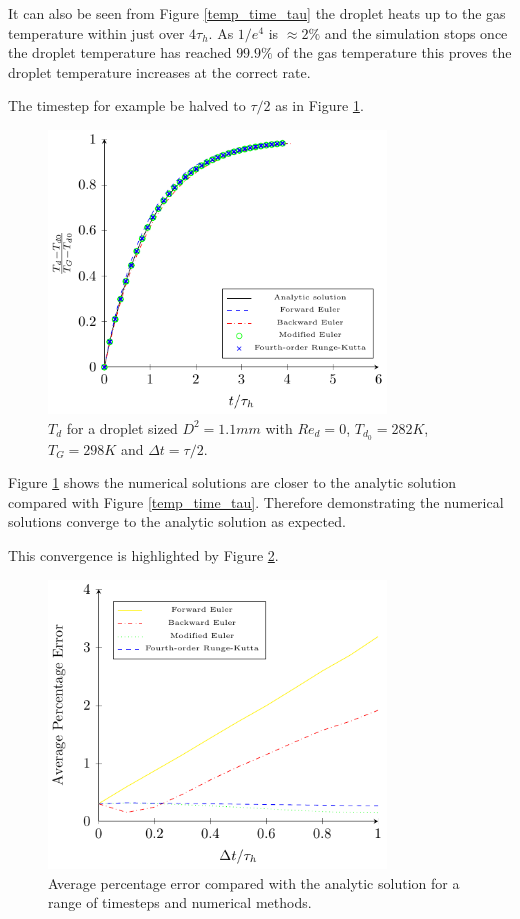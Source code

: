 \documentclass[../Interim_Report_Master]{subfiles}
\begin{document}
It can also be seen from Figure \ref{temp_time_tau} the droplet heats up to the gas temperature within just over $4\tau_h$. As $1/e^4$ is $\approx 2\%$ and the simulation stops once the droplet temperature has reached $99.9\%$ of the gas temperature this proves the droplet temperature increases at the correct rate.

The timestep for example be halved to $\tau/2$ as in Figure \ref{temp_time_tau_2}.
\begin{figure}[h]
	\centering
	\includegraphics[width=0.8\textwidth]{./Diagrams/Uncoupled_Heat_Transfer_tau_2/Uncoupled_Heat_Transfer_tau_2.pdf}
	\caption{$T_d$ for a droplet sized $D^2=1.1mm$ with $Re_d=0$, $T_{d_0}=282K$, $T_G=298K$ and $\Delta t=\tau/2$.}
	\label{temp_time_tau_2}
\end{figure}

Figure \ref{temp_time_tau_2} shows the numerical solutions are closer to the analytic solution compared with Figure \ref{temp_time_tau}. Therefore demonstrating the numerical solutions converge to the analytic solution as expected. 

This convergence is highlighted by Figure \ref{uc_temp_convergence}.
\begin{figure}[h]
	\centering
	\includegraphics[width=0.8\textwidth]{./Diagrams/Uncoupled_Temp_Convergence/Uncoupled_Temp_Convergence.pdf}
	\caption{Average percentage error compared with the analytic solution for a range of timesteps and numerical methods.}
	\label{uc_temp_convergence}
\end{figure}
\end{document}
